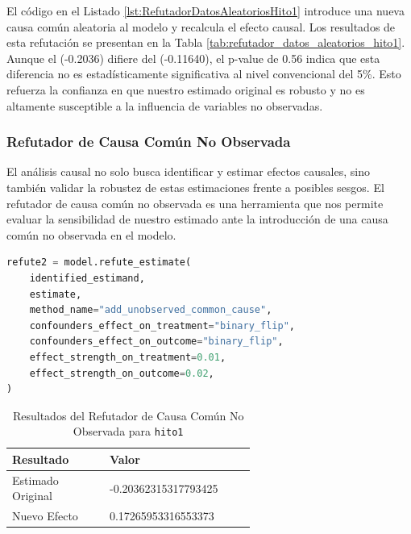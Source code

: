 El código en el Listado \ref{lst:RefutadorDatosAleatoriosHito1} introduce una nueva causa común aleatoria al modelo y recalcula el efecto causal. Los resultados de esta refutación se presentan en la Tabla \ref{tab:refutador_datos_aleatorios_hito1}. Aunque el  (-0.2036) difiere del  (-0.11640), el p-value de 0.56 indica que esta diferencia no es estadísticamente significativa al nivel convencional del 5\%. Esto refuerza la confianza en que nuestro estimado original es robusto y no es altamente susceptible a la influencia de variables no observadas.



\subsubsection{Refutador de Causa Común No Observada}

El análisis causal no solo busca identificar y estimar efectos causales, sino también validar la robustez de estas estimaciones frente a posibles sesgos. El refutador de causa común no observada es una herramienta que nos permite evaluar la sensibilidad de nuestro estimado ante la introducción de una causa común no observada en el modelo.

\begin{minipage}{0.5\textwidth}
    \begin{lstlisting}[language=Python, caption=Refutador de causa común no observada para \texttt{hito1}, label=lst:RefutadorCausaComúnNoObservadaHito1]
refute2 = model.refute_estimate(
    identified_estimand,
    estimate,
    method_name="add_unobserved_common_cause",
    confounders_effect_on_treatment="binary_flip",
    confounders_effect_on_outcome="binary_flip",
    effect_strength_on_treatment=0.01,
    effect_strength_on_outcome=0.02,
)
\end{lstlisting}
\end{minipage}
\hfill
\begin{minipage}{0.45\textwidth}
    \begin{table}[H]
        \centering
        \begin{tabular}{lp{0.6\linewidth}}
            \toprule
            \textbf{Resultado} & \textbf{Valor} \\
            \midrule
            Estimado Original & -0.20362315317793425 \\
            Nuevo Efecto & 0.17265953316553373 \\
            \bottomrule
        \end{tabular}
        \caption{Resultados del Refutador de Causa Común No Observada para \texttt{hito1}}
        \label{tab:refutador_causa_no_observada_hito1}
    \end{table}
\end{minipage}

